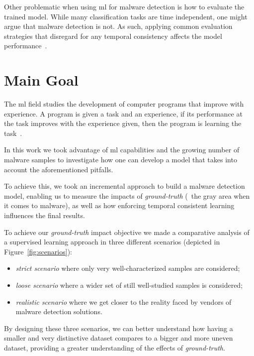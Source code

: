 Other problematic when using \gls{ml} for malware detection is how to evaluate the trained model.
While many classification tasks are time independent, one might argue that malware detection is not.
As such, applying common evaluation strategies that disregard for any temporal consistency affects the model performance~\cite{deo2016prescience,jordaney2017transcend,rossow:practices}.


\section{Main Goal}
\label{section:overview}

The \acrfull{ml} field studies the development of computer programs that improve with experience.
A program is given a task and an experience, if its performance at the task improves with the experience given, then the program is learning the task~\cite{mitchell:ml}.

In this work we took advantage of \gls{ml} capabilities and the growing number of malware samples to investigate how one can develop a model that takes into account the aforementioned pitfalls.

To achieve this, we took an incremental approach to build a malware detection model, enabling us to measure the impacts of \textit{ground-truth} (\ie\ the gray area when it comes to malware), as well as how enforcing temporal consistent learning influences the final results.

To achieve our \textit{ground-truth} impact objective we made a comparative analysis of a supervised learning approach in three different scenarios (depicted in Figure~\ref{fig:scenarios}): 

\begin{itemize}
	\item \emph{strict scenario} where only very well-characterized samples are considered;
	\item \emph{loose scenario} where a wider set of still well-studied samples is considered;
	\item \emph{realistic scenario} where we get closer to the reality faced by vendors of malware detection solutions.
\end{itemize}

By designing these three scenarios, we can better understand how having a smaller and very distinctive dataset compares to a bigger and more uneven dataset, providing a greater understanding of the effects of \textit{ground-truth}.


